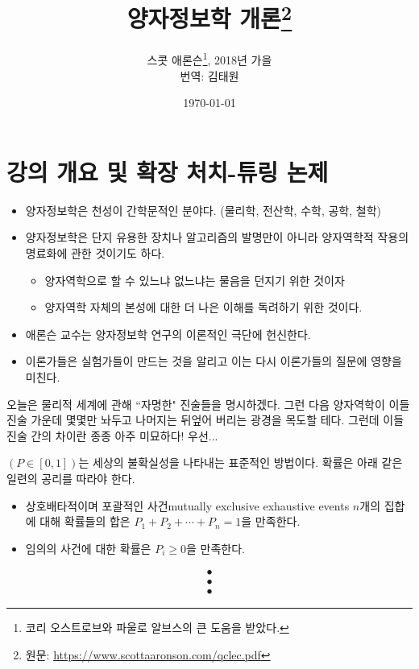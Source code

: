 \documentclass[a4paper,chapter,kosection,atbegshi,hidelinks,itemph]{oblivoir}
\begin{document}
\title{양자정보학 개론\thanks{원문: \url{https://www.scottaaronson.com/qclec.pdf}}}
\author{
    스콧 애론슨\thanks{코리 오스트로브와 파울로 알브스의 큰 도움을 받았다.}, 
    2018년 가을\\
    번역: 김태원
}
\date{\today}
\newpage
\maketitle\thispagestyle{empty}\newpage

\tableofcontents\pagestyle{plain}

\chapter{강의 개요 및 확장 처치-튜링 논제}
\begin{itemize}[label=\(\blacktriangleright\)]
    \item 양자정보학은 천성이 간학문적인 분야다. (물리학, 전산학, 수학, 공학, 철학)
    \item 양자정보학은 단지 유용한 장치나 알고리즘의 발명만이 아니라 양자역학적 작용의 명료화에 관한 것이기도 하다.
    \begin{itemize}
        \item 양자역학으로 할 수 있느냐 없느냐는 물음을 던지기 위한 것이자
        \item 양자역학 자체의 본성에 대한 더 나은 이해를 독려하기 위한 것이다.
    \end{itemize}
    \item 애론슨 교수는 양자정보학 연구의 이론적인 극단에 헌신한다.
    \item 이론가들은 실험가들이 만드는 것을 알리고 이는 다시 이론가들의 질문에 영향을 미친다.
\end{itemize}\hfill\break
오늘은 물리적 세계에 관해 ``자명한" 진술들을 명시하겠다.
그런 다음 양자역학이 이들 진술 가운데 몇몇만 놔두고 나머지는 뒤엎어 버리는 광경을
목도할 테다. 
그런데 이들 진술 간의 차이란 종종 아주 미묘하다!
우선...\hfill\break

\begin{description}[leftmargin=0cm]
    \item[\textbf{확률}\;] 
        $(P\in[0,1])$는 세상의 불확실성을 나타내는 표준적인 방법이다. 
        확률은 아래 같은 일련의 공리를 따라야 한다.
        \begin{itemize}[label=$\blacktriangleright$]
            \item  상호배타적이며 포괄적인 사건{\footnotesize mutually exclusive
            exhaustive events} $n$개의 집합에 대해  
                확률들의 합은 $P_1+P_2+\cdots+P_n=1$을 만족한다.
            \item 임의의 사건에 대한 확률은 $P_i\geq0$을 만족한다.
        \end{itemize}
        \begin{align*}\bullet\\\bullet\\\bullet\end{align*}
\end{description}
\end{document}
